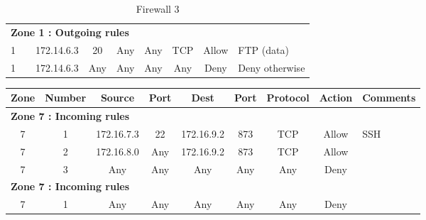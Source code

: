 \documentclass[a4paper,titlepage]{article}
\begin{document}
\begin{landscape}
\begin{table}[h]
\begin{tabular}{c|c|cc|cc|ccl}
			\hline
			\multicolumn{9}{l}{\textbf{Zone 1 : Outgoing rules}}\\
			1 &  & 172.14.6.3 & 20 & Any & Any & TCP & Allow & FTP (data)\\
			1 &  & 172.14.6.3 & Any & Any & Any & Any & Deny & Deny otherwise\\
		\end{tabular}
		\caption{Firewall 3}
	\end{table}
	\vspace*{\fill}
\end{landscape}




\begin{table}[h]
	\center
	\begin{tabular}{c|c|cc|cc|ccl}
		Zone & Number & Source & Port & Dest & Port & Protocol & Action & \multicolumn{1}{c}{Comments}\\
		\hline
		\multicolumn{9}{l}{\textbf{Zone 7 : Incoming rules}}\\
		7 & 1 & 172.16.7.3 & 22 & 172.16.9.2 & 873 & TCP & Allow & SSH\\
		7 & 2 & 172.16.8.0 & Any & 172.16.9.2 & 873 & TCP & Allow & \\
		7 & 3 & Any & Any & Any & Any & Any & Deny & \\
		\hline
		\multicolumn{9}{l}{\textbf{Zone 7 : Incoming rules}}\\
		7 & 1 & Any & Any & Any & Any & Any & Deny & \\
		

\end{tabular}
\end{table}
\end{document}
